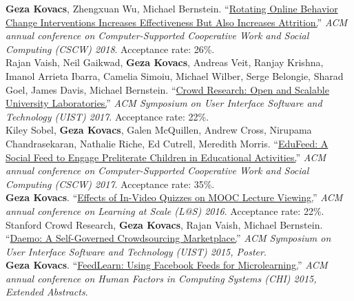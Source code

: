 
\textbf{Geza Kovacs}, {\small Zhengxuan Wu, Michael Bernstein.} ``\href{https://hci.stanford.edu/publications/2018/habitlab/habitlab-cscw18.pdf}{Rotating Online Behavior Change Interventions Increases Effectiveness But Also Increases Attrition.}'' \emph{ACM annual conference on Computer-Supported Cooperative Work and Social Computing (CSCW) 2018}. Acceptance rate: 26\%.\\

{\small Rajan Vaish, Neil Gaikwad,} \textbf{Geza Kovacs}, {\small Andreas Veit, Ranjay Krishna, Imanol Arrieta Ibarra, Camelia Simoiu, Michael Wilber, Serge Belongie, Sharad Goel, James Davis, Michael Bernstein.} ``\href{https://hci.stanford.edu/publications/2017/crowdresearch/crowd-research-uist2017.pdf}{Crowd Research: Open and Scalable University Laboratories.}'' \emph{ACM Symposium on User Interface Software and Technology (UIST) 2017}. Acceptance rate: 22\%.\\

{\small Kiley Sobel,} \textbf{Geza Kovacs}, {\small Galen McQuillen, Andrew Cross, Nirupama Chandrasekaran, Nathalie Riche, Ed Cutrell, Meredith Morris.} ``\href{https://www.microsoft.com/en-us/research/wp-content/uploads/2016/10/edufeed.pdf}{EduFeed: A Social Feed to Engage Preliterate Children in Educational Activities.}'' \emph{ACM annual conference on Computer-Supported Cooperative Work and Social Computing (CSCW) 2017}. Acceptance rate: 35\%.\\

\textbf{Geza Kovacs}. ``\href{https://hci.stanford.edu/publications/2016/invideo/invideo-las2016.pdf}{Effects of In-Video Quizzes on MOOC Lecture Viewing.}'' \emph{ACM annual conference on Learning at Scale (L@S) 2016}. Acceptance rate: 22\%.\\


{\small Stanford Crowd Research,} \textbf{Geza Kovacs}, {\small Rajan Vaish, Michael Bernstein.} ``\href{https://hci.stanford.edu/publications/2015/crowdresearch/daemo-uist.pdf}{Daemo: A Self-Governed Crowdsourcing Marketplace.}'' \emph{ACM Symposium on User Interface Software and Technology (UIST) 2015, Poster}.\\

\textbf{Geza Kovacs}. ``\href{https://hci.stanford.edu/publications/2015/feedlearn/feedlearn-chi2015.pdf}{FeedLearn: Using Facebook Feeds for Microlearning.}'' \emph{ACM annual conference on Human Factors in Computing Systems (CHI) 2015, Extended Abstracts}.\\ %

